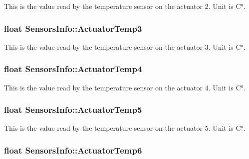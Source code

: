This is the value read by the temperature sensor on the actuator 2. Unit is C°. 

\subsubsection[{\texorpdfstring{Actuator\+Temp3}{ActuatorTemp3}}]{\setlength{\rightskip}{0pt plus 5cm}float Sensors\+Info\+::\+Actuator\+Temp3}\hypertarget{struct_sensors_info_aae8cdcf3e2412f99ec5cdc5a13db1528}{}\label{struct_sensors_info_aae8cdcf3e2412f99ec5cdc5a13db1528}


This is the value read by the temperature sensor on the actuator 3. Unit is C°. 

\subsubsection[{\texorpdfstring{Actuator\+Temp4}{ActuatorTemp4}}]{\setlength{\rightskip}{0pt plus 5cm}float Sensors\+Info\+::\+Actuator\+Temp4}\hypertarget{struct_sensors_info_a69bb9fe27b7e18a1c09da9135a13c324}{}\label{struct_sensors_info_a69bb9fe27b7e18a1c09da9135a13c324}


This is the value read by the temperature sensor on the actuator 4. Unit is C°. 

\subsubsection[{\texorpdfstring{Actuator\+Temp5}{ActuatorTemp5}}]{\setlength{\rightskip}{0pt plus 5cm}float Sensors\+Info\+::\+Actuator\+Temp5}\hypertarget{struct_sensors_info_a03c089c08df66cc62b0aa768557e2128}{}\label{struct_sensors_info_a03c089c08df66cc62b0aa768557e2128}


This is the value read by the temperature sensor on the actuator 5. Unit is C°. 

\subsubsection[{\texorpdfstring{Actuator\+Temp6}{ActuatorTemp6}}]{\setlength{\rightskip}{0pt plus 5cm}float Sensors\+Info\+::\+Actuator\+Temp6}\hypertarget{struct_sensors_info_aa22bb78967dc3b480280c422613f8382}{}\label{struct_sensors_info_aa22bb78967dc3b480280c422613f8382}


